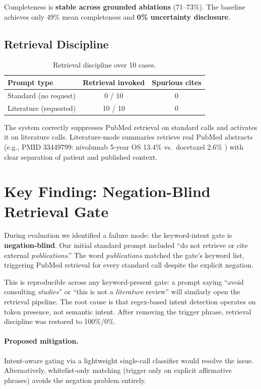 \documentclass[11pt,twocolumn]{article}
\begin{document}
Completeness is \textbf{stable across grounded ablations} (71--73\%). The baseline achieves only 49\% mean completeness and \textbf{0\% uncertainty disclosure}.

\subsection{Retrieval Discipline}

\begin{table}[h]
\centering
\small
\begin{tabular}{lcc}
\toprule
\textbf{Prompt type} & \textbf{Retrieval invoked} & \textbf{Spurious cites} \\
\midrule
Standard (no request) & 0 / 10 & 0 \\
Literature (requested)  & 10 / 10 & 0 \\
\bottomrule
\end{tabular}
\caption{Retrieval discipline over 10 cases.}
\label{tab:retrieval}
\end{table}

The system correctly suppresses PubMed retrieval on standard calls and activates it on literature calls. Literature-mode summaries retrieve real PubMed abstracts (e.g., PMID 33449799: nivolumab 5-year OS 13.4\% vs.\ docetaxel 2.6\% \cite{brahmer2021nivolumab}) with clear separation of patient and published context.

\section{Key Finding: Negation-Blind Retrieval Gate}

During evaluation we identified a failure mode: the keyword-intent gate is
\textbf{negation-blind}. Our initial standard prompt included ``do not retrieve or cite external \emph{publications}.'' The word \emph{publications} matched the gate's keyword list, triggering PubMed retrieval for every standard call despite the explicit negation.

This is reproducible across any keyword-present gate: a prompt saying
``avoid consulting \emph{studies}'' or ``this is not a \emph{literature}
review'' will similarly open the retrieval pipeline. The root cause is
that regex-based intent detection operates on token presence, not
semantic intent. After removing the trigger phrase, retrieval discipline was restored to 100\%/0\%.

\paragraph{Proposed mitigation.}
Intent-aware gating via a lightweight single-call classifier would resolve the issue. Alternatively,
whitelist-only matching (trigger only on explicit affirmative phrases) avoids the negation problem entirely.
\end{document}
